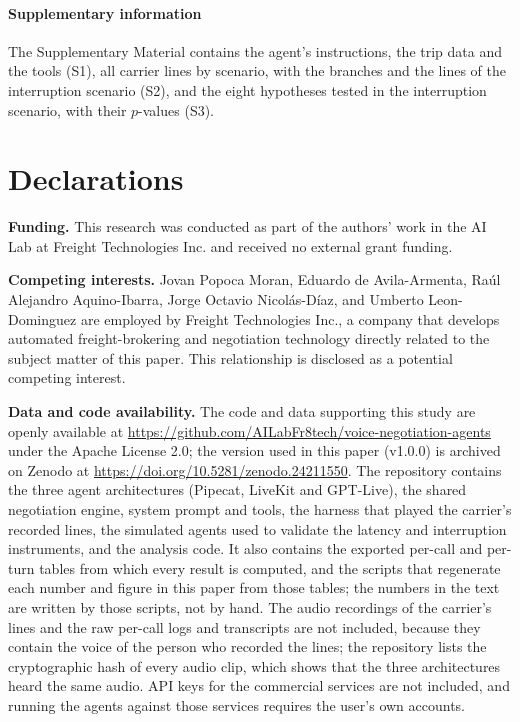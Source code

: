 \documentclass[11pt]{article}
\newcommand{\bmhead}[1]{\paragraph*{#1}}
\newcommand{\backmatter}{}
\begin{document}
\backmatter

\bmhead{Supplementary information}

The Supplementary Material contains the agent's instructions, the trip data and the
tools (S1), all carrier lines by scenario, with the branches and the lines of the
interruption scenario (S2), and the eight hypotheses tested in the interruption scenario, with their $p$-values (S3).

\section*{Declarations}
\label{sec:declarations}

\textbf{Funding.} This research was conducted as part of the authors' work in the AI Lab at Freight Technologies Inc. and received no external grant funding.

\textbf{Competing interests.} Jovan Popoca Moran, Eduardo de Avila-Armenta, Ra\'ul Alejandro Aquino-Ibarra, Jorge Octavio Nicol\'as-D\'iaz, and Umberto Leon-Dominguez are employed by Freight Technologies Inc., a company that develops automated freight-brokering and negotiation technology directly related to the subject matter of this paper. This relationship is disclosed as a potential competing interest.

\textbf{Data and code availability.} The code and data supporting this study are openly available at \url{https://github.com/AILabFr8tech/voice-negotiation-agents} under the Apache License 2.0; the version used in this paper (v1.0.0) is archived on Zenodo at \url{https://doi.org/10.5281/zenodo.24211550}. The repository contains the three agent architectures (Pipecat, LiveKit and GPT-Live), the shared negotiation engine, system prompt and tools, the harness that played the carrier's recorded lines, the simulated agents used to validate the latency and interruption instruments, and the analysis code. It also contains the exported per-call and per-turn tables from which every result is computed, and the scripts that regenerate each number and figure in this paper from those tables; the numbers in the text are written by those scripts, not by hand. The audio recordings of the carrier's lines and the raw per-call logs and transcripts are not included, because they contain the voice of the person who recorded the lines; the repository lists the cryptographic hash of every audio clip, which shows that the three architectures heard the same audio. API keys for the commercial services are not included, and running the agents against those services requires the user's own accounts.
\end{document}
